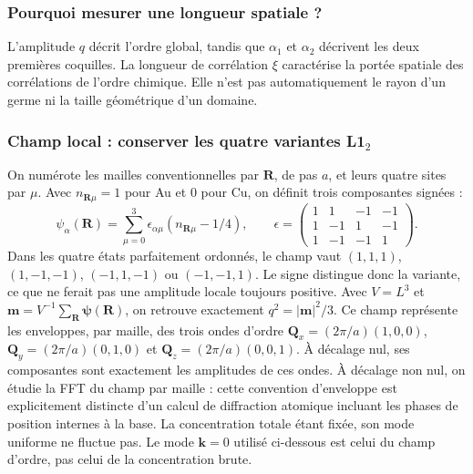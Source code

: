 \subsubsection{Pourquoi mesurer une longueur spatiale ?}
L'amplitude $q$ décrit l'ordre global, tandis que $\alpha_1$ et $\alpha_2$ décrivent les deux premières coquilles. La longueur de corrélation $\xi$ caractérise la portée spatiale des corrélations de l'ordre chimique. Elle n'est pas automatiquement le rayon d'un germe ni la taille géométrique d'un domaine.
\subsubsection{Champ local : conserver les quatre variantes \texorpdfstring{L1$_2$}{L12}}
On numérote les mailles conventionnelles par $\mathbf R$, de pas $a$, et leurs quatre sites par $\mu$. Avec $n_{\mathbf R\mu}=1$ pour Au et 0 pour Cu, on définit trois composantes signées :
\[\psi_\alpha(\mathbf R)=\sum_{\mu=0}^{3}\epsilon_{\alpha\mu}(n_{\mathbf R\mu}-1/4),\qquad\epsilon=\begin{pmatrix}1&1&-1&-1\\1&-1&1&-1\\1&-1&-1&1\end{pmatrix}.\]
Dans les quatre états parfaitement ordonnés, le champ vaut $(1,1,1)$, $(1,-1,-1)$, $(-1,1,-1)$ ou $(-1,-1,1)$. Le signe distingue donc la variante, ce que ne ferait pas une amplitude locale toujours positive. Avec $V=L^3$ et $\mathbf m=V^{-1}\sum_{\mathbf R}\boldsymbol\psi(\mathbf R)$, on retrouve exactement $q^2=|\mathbf m|^2/3$.
Ce champ représente les enveloppes, par maille, des trois ondes d'ordre $\mathbf Q_x=(2\pi/a)(1,0,0)$, $\mathbf Q_y=(2\pi/a)(0,1,0)$ et $\mathbf Q_z=(2\pi/a)(0,0,1)$. À décalage nul, ses composantes sont exactement les amplitudes de ces ondes. À décalage non nul, on étudie la FFT du champ par maille : cette convention d'enveloppe est explicitement distincte d'un calcul de diffraction atomique incluant les phases de position internes à la base.
La concentration totale étant fixée, son mode uniforme ne fluctue pas. Le mode $\mathbf k=0$ utilisé ci-dessous est celui du champ d'ordre, pas celui de la concentration brute.
